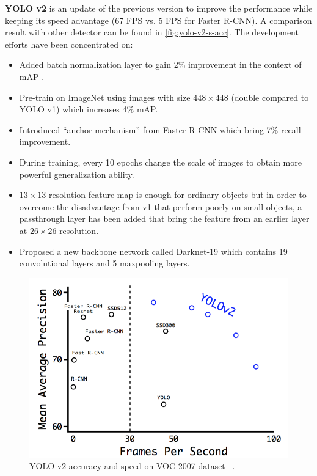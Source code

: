 \textbf{YOLO v2} \cite{yolov2-paper-2016} is an update of the
previous version to improve the performance while
keeping its speed advantage (67 FPS vs. 5 FPS for Faster R-CNN).
A comparison result with other detector can be found in 
\autoref{fig:yolo-v2-s-acc}. The development efforts have been concentrated on:

\begin{itemize}
    \item Added batch normalization layer to gain 2\% improvement in the 
    context of mAP .

    \item Pre-train on ImageNet using images with size $448 \times
    448$ (double compared to YOLO v1) which increases 4\% mAP.

    \item Introduced ``anchor mechanism'' from Faster R-CNN which
    bring 7\% recall improvement.

    \item During training, every 10 epochs change the scale of images to obtain
    more powerful generalization ability.

    \item $13 \times 13$ resolution feature map is enough for ordinary objects
    but in order to overcome the disadvantage from v1 that perform poorly on
    small objects, a passthrough layer has been added that bring the feature
    from an earlier layer at $26 \times 26$ resolution.

    \item Proposed a new backbone network called Darknet-19 which contains 19
    convolutional layers and 5 maxpooling layers.
\end{itemize}

\begin{figure}
    \begin{center}
    \includegraphics[scale=0.7]{figures/yolov2_speed_and_acc.png}
    \end{center}
    \caption{YOLO v2 accuracy and speed on VOC 2007 dataset
    ~\protect\cite{yolov2-paper-2016}.}
    \label{fig:yolo-v2-s-acc}
\end{figure}


